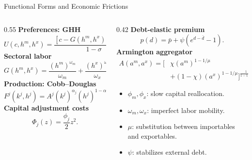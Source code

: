 \documentclass[10pt]{beamer}
\begin{document}
\begin{frame}{Functional Forms and Economic Frictions}
\footnotesize
\begin{columns}[T,onlytextwidth]
\begin{column}{0.55\textwidth}
\textbf{Preferences: GHH}
\[
U(c,h^m,h^x)
=
\frac{[c-G(h^m,h^x)]^{1-\sigma}-1}{1-\sigma}.
\]
\textbf{Sectoral labor}
\[
G(h^m,h^x)
=
\frac{(h^m)^{\omega_m}}{\omega_m}
+
\frac{(h^x)^{\omega_x}}{\omega_x}.
\]
\textbf{Production: Cobb--Douglas}
\[
F^j(k^j,h^j)
=
A^j(k^j)^{\alpha_j}(h^j)^{1-\alpha_j}.
\]
\textbf{Capital adjustment costs}
\[
\Phi_j(z)=\frac{\phi_j}{2}z^2.
\]
\end{column}
\begin{column}{0.42\textwidth}
\textbf{Debt-elastic premium}
\[
p(d)=\bar p+\psi(e^{d-\bar d}-1).
\]
\textbf{Armington aggregator}
\[
\begin{aligned}
A(a^m,a^x)=\big[&\chi(a^m)^{1-1/\mu}\\
&+(1-\chi)(a^x)^{1-1/\mu}\big]^{\frac{1}{1-1/\mu}}.
\end{aligned}
\]
\vspace{0.15cm}
\begin{itemize}
    \item $\phi_m,\phi_x$: slow capital reallocation.
    \item $\omega_m,\omega_x$: imperfect labor mobility.
    \item $\mu$: substitution between importables and exportables.
    \item $\psi$: stabilizes external debt.
\end{itemize}
\end{column}
\end{columns}
\end{frame}
\end{document}
